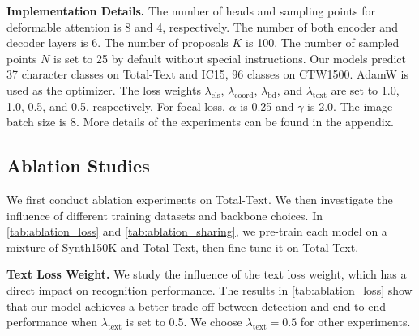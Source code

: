 \documentclass[10pt,twocolumn,letterpaper]{article}
\begin{document}
\noindent \textbf{Implementation Details.} 
The number of heads and sampling points for deformable attention is 8 and 4, respectively. The number of both encoder and decoder layers is 6. The number of proposals $K$ is 100. The number of sampled points $N$ is set to 25 by default without special instructions. Our models predict 37 character classes on Total-Text and IC15, 96 classes on CTW1500. AdamW \cite{loshchilov2017decoupled} is used as the optimizer. The loss weights $\lambda_{\text{cls}}$, $\lambda_{\text{coord}}$,
$\lambda_{\text{bd}}$, and $\lambda_{\text{text}}$ are set to 1.0, 1.0, 0.5, and 0.5, respectively. For focal loss, $\alpha$ is 0.25 and $\gamma$ is 2.0.
The image batch size is 8. More details of the experiments can be found in the appendix. 

\subsection{Ablation Studies}
\label{sec:ablation}
We first conduct ablation experiments on Total-Text. We then investigate the influence of different training datasets and backbone choices. In \cref{tab:ablation_loss} and \cref{tab:ablation_sharing}, we pre-train each model on a mixture of Synth150K and Total-Text, then fine-tune it on Total-Text.

\noindent \textbf{Text Loss Weight.} We study the influence of the text loss weight, which has a direct impact on recognition performance. The results in \cref{tab:ablation_loss} show that our model achieves a better trade-off between detection and end-to-end performance when $\lambda_{\text{text}}$ is set to 0.5. We choose $\lambda_{\text{text}} = 0.5$ for other experiments.

\begin{table}[!h]
    \centering
    \setlength{\tabcolsep}{6pt}
\caption{Hyper-parameter study of $\lambda_{\text{text}}$. E2E: the end-to-end spotting results. None (Full) denotes the F1-measure without (with) using the lexicon that includes all words in the test set.}
\label{tab:ablation_loss}
\end{table}
\end{document}
